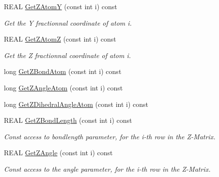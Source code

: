 \begin{DoxyCompactItemize}
\mbox{\label{class_obj_cryst_1_1_z_scatterer_a8b2384b8c75dd7078b134553a5694101}} 
R\+E\+AL \mbox{\hyperlink{class_obj_cryst_1_1_z_scatterer_a8b2384b8c75dd7078b134553a5694101}{Get\+Z\+AtomY}} (const int i) const
\begin{DoxyCompactList}\small\item\em Get the Y fractionnal coordinate of atom i. \end{DoxyCompactList}\item 
\mbox{\label{class_obj_cryst_1_1_z_scatterer_a4597d7ae7aa099821df9981a19b2763a}} 
R\+E\+AL \mbox{\hyperlink{class_obj_cryst_1_1_z_scatterer_a4597d7ae7aa099821df9981a19b2763a}{Get\+Z\+AtomZ}} (const int i) const
\begin{DoxyCompactList}\small\item\em Get the Z fractionnal coordinate of atom i. \end{DoxyCompactList}\item 
long \mbox{\hyperlink{class_obj_cryst_1_1_z_scatterer_a43c9a89c1b3523e0f321bb587342a9af}{Get\+Z\+Bond\+Atom}} (const int i) const
\item 
long \mbox{\hyperlink{class_obj_cryst_1_1_z_scatterer_af6ffcf6d863d090c6e72c2749f6c7768}{Get\+Z\+Angle\+Atom}} (const int i) const
\item 
long \mbox{\hyperlink{class_obj_cryst_1_1_z_scatterer_a8ab9425588c99c32c4c8c68ebe641723}{Get\+Z\+Dihedral\+Angle\+Atom}} (const int i) const
\item 
\mbox{\label{class_obj_cryst_1_1_z_scatterer_ae3bc8fd7255fea2bd8c5e5595ba2369a}} 
R\+E\+AL \mbox{\hyperlink{class_obj_cryst_1_1_z_scatterer_ae3bc8fd7255fea2bd8c5e5595ba2369a}{Get\+Z\+Bond\+Length}} (const int i) const
\begin{DoxyCompactList}\small\item\em Const access to bondlength parameter, for the i-\/th row in the Z-\/\+Matrix. \end{DoxyCompactList}\item 
\mbox{\label{class_obj_cryst_1_1_z_scatterer_a95b97eb1b92c41784a4f652fea59eb93}} 
R\+E\+AL \mbox{\hyperlink{class_obj_cryst_1_1_z_scatterer_a95b97eb1b92c41784a4f652fea59eb93}{Get\+Z\+Angle}} (const int i) const
\begin{DoxyCompactList}\small\item\em Const access to the angle parameter, for the i-\/th row in the Z-\/\+Matrix. \end{DoxyCompactList}\item 

\end{DoxyCompactItemize}
